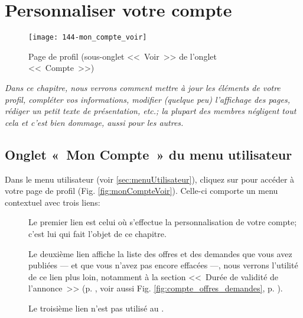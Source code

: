 \chapter{Personnaliser votre compte}\label{chap:personnaliserCompte}
\begin{figure}
    \texttt{[image: 144-mon\_compte\_voir]}
    \caption[Page de profil]{Page de profil (sous-onglet <<~Voir~>> de l'onglet <<~Compte~>>)}
    \label{fig:monCompteVoir}
\end{figure}

{\slshape
\noindent Dans ce chapitre, nous verrons comment mettre à jour les éléments de votre profil, compléter vos informations, modifier (quelque peu) l'affichage des pages, rédiger un petit texte de présentation, etc.; la plupart des membres négligent tout cela et c'est bien dommage, aussi pour les autres.}

\section[Onglet «~Mon Compte~»]{Onglet «~Mon Compte~» du menu utilisateur}\label{page:compte_offres_demandes}

Dans le menu utilisateur (voir \vref{sec:menuUtilisateur}), cliquez sur  pour accéder à votre page de profil (Fig. \vref{fig:monCompteVoir}). Celle-ci comporte un menu contextuel avec trois liens:

\begin{description}
    \item[] Le premier lien est celui où s'effectue la personnalisation de votre compte; c'est lui qui fait l'objet de ce chapitre.
    \item[] Le deuxième lien affiche la liste des offres et des demandes que vous avez publiées --- et que vous n’avez pas encore effacées ---, nous verrons l'utilité de ce lien plus loin, notamment à la section <<~Durée de validité de l'annonce~>> (p. \pageref{sec:dureeValiditeAnnonce}, voir aussi Fig. \ref{fig:compte_offres_demandes}, p. \pageref{fig:compte_offres_demandes}).
    \item[] Le troisième lien n’est pas utilisé au \CdS. 
\end{description}


